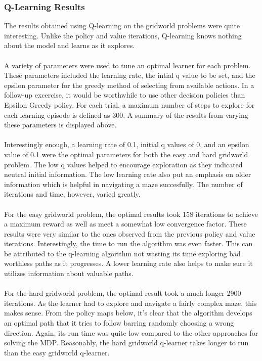 \documentclass[h]{article}
\begin{document}
 \subsubsection*{Q-Learning Results}
 The results obtained using Q-learning on the gridworld problems were quite 
 interesting.  Unlike the policy and value iterations, Q-learning knows nothing 
 about the model and learns as it explores.  
 \\ \\ 
 A variety of parameters were 
 used to tune an optimal learner for each problem.  These parameters included the
 learning rate, the intial q value to be set, and the epsilon 
 parameter for the greedy method of selecting from available actions.  In a follow-up excercise, it would be worthwhile to use other decision policies 
 than Epsilon Greedy policy.  For each 
 trial, a maximum number of steps to explore for each learning episode is defined as 300.  
 A summary of the results from varying these parameters is displayed above.  
 \\ \\
 Interestingly enough, a learning rate of 0.1, initial q values of 0, and an 
 epsilon value of 0.1 were the optimal parameters for both the easy and hard 
 gridworld problem.  The low q values helped to encourage exploration as they indicated neutral initial information.
 The low learning rate also put an emphasis on older information which is 
 helpful in navigating a maze succesfully.
 The number of iterations and time, however, varied greatly.  
 \\ \\
 For the easy gridworld problem, the optimal results took 158 iterations to 
 achieve a maximum reward as well as meet a somewhat low convergence factor.  
 These results were very similar to the ones observed from the previous policy and 
 value iterations.  Interestingly, the time to run the algorithm was even 
 faster.  This can be attributed to the q-learning algorithm not wasting its 
 time exploring bad worthless paths as it progresses.  A lower learning rate 
 also helps to make sure it utilizes information about valuable paths.
 \\ \\
 For the hard gridworld problem, the optimal result took a much longer 2900 
 iterations.  As the learner had to explore and navigate a fairly complex maze, 
 this makes sense.  From the policy maps below, it's clear that the algorithm 
 develops an optimal path that it tries to follow barring randomly choosing a 
 wrong direction.  Again, its run time was quite low compared to the other 
 approaches for solving the MDP.  Reasonably, the hard gridworld q-learner takes 
 longer to run than the easy gridworld q-learner. 
\end{document}
